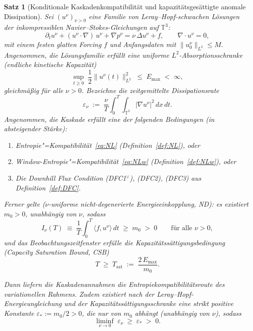 \documentclass[12pt,a4paper]{article}
\theoremstyle{breakdef}
\theoremstyle{breakplain}
\newtheorem{theorem}[definition]{Satz}
\theoremstyle{breakdef}
\begin{document}
\begin{theorem}[Konditionale Kaskadenkompatibilität und kapazitätsgesättigte anomale Dissipation]\label{thm:anomalous}
Sei $(u^\nu)_{\nu > 0}$ eine Familie von Leray--Hopf-schwachen Lösungen
der inkompressiblen Navier--Stokes-Gleichungen auf $\mathbb{T}^3$:
\begin{equation}\label{eq:NSE}
  \partial_t u^\nu + (u^\nu \cdot \nabla)\,u^\nu
  + \nabla p^\nu
  = \nu\,\Delta u^\nu + f,
  \qquad \nabla \cdot u^\nu = 0,
\end{equation}
mit einem festen glatten Forcing $f$ und Anfangsdaten mit
$\|u^\nu_0\|_{L^2} \le M$. Angenommen, die Lösungsfamilie erfüllt eine uniforme
$L^2$-Absorptionsschranke (endliche kinetische Kapazität)
\begin{equation}\label{eq:L2_absorbing}
  \sup_{t \ge 0} \;\frac{1}{2}\|u^\nu(t)\|_{L^2}^2 \;\le\; E_{\max} \;<\; \infty,
\end{equation}
gleichmäßig für alle $\nu > 0$. Bezeichne die zeitgemittelte Dissipationsrate
\begin{equation}\label{eq:diss}
  \varepsilon_\nu
  \;:=\;
  \frac{\nu}{T} \int_0^T \!\!\int_{\mathbb{T}^3}
    |\nabla u^\nu|^2 \,dx\,dt.
\end{equation}
Angenommen, die Kaskade erfüllt \emph{eine} der folgenden Bedingungen
(in absteigender Stärke):
\begin{enumerate}
  \item[\textup{(H1)}] Entropie"=Kompatibilität~\eqref{eq:NL}
    (Definition~\ref{def:NL}), oder
  \item[\textup{(H2)}] Window-Entropie"=Kompatibilität~\eqref{eq:NLw}
    (Definition~\ref{def:NLw}), oder
  \item[\textup{(H3)}] Die Downhill Flux Condition
    \textup{(DFC1$^\vee$), (DFC2), (DFC3)} aus Definition~\ref{def:DFC}.
\end{enumerate}
Ferner gelte \textup{($\nu$-uniforme nicht-degenerierte Energieeinkopplung, ND)}:
es existiert $m_0 > 0$, unabhängig von $\nu$, sodass
\begin{equation}\label{eq:ND}
  I_\nu(T) \;\equiv\; \frac{1}{T}\int_0^T \langle f, u^\nu \rangle\,dt \;\ge\; m_0 \;>\; 0
  \qquad \text{für alle } \nu > 0,
\end{equation}
und das Beobachtungszeitfenster erfülle die Kapazitätssättigungsbedingung (Capacity Saturation Bound, CSB)
\begin{equation}\label{eq:T_sat}
  T \;\ge\; T_{\mathrm{sat}} \;:=\; \frac{2\,E_{\max}}{m_0}.
\end{equation}

Dann liefern die Kaskadenannahmen die Entropiekompatibilitätsroute des
variationellen Rahmens. Zudem existiert nach der Leray--Hopf-Energieungleichung
und der Kapazitätssättigungsschranke eine strikt positive Konstante
$\varepsilon_* := m_0/2 > 0$, die nur von $m_0$ abhängt (unabhängig von $\nu$), sodass
\begin{equation}\label{eq:anomalous}
  \liminf_{\nu \to 0}\; \varepsilon_\nu
  \;\ge\; \varepsilon_* \;>\; 0.
\end{equation}
\end{theorem}
\end{document}
